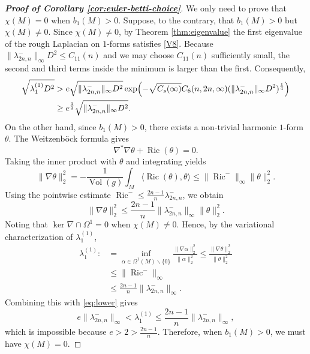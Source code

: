\documentclass[12pt, twoside]{article}
\theoremstyle{definition}
\numberwithin{equation}{section}
\def \a {\alpha }
\def \la {\lambda}
\def\Om{\Omega}
\def\na {\nabla}
\begin{document}
\begin{proof}[\textbf{Proof of Corollary \ref{cor:euler-betti-choice}}]
	We only need to prove that $\chi(M)=0$ when $b_{1}(M)>0$. Suppose, to the contrary, that $b_{1}(M)>0$ but $\chi(M)\neq0$. 
	Since $\chi(M)\neq0$, by Theorem \ref{thm:eigenvalue} the first eigenvalue of the rough Laplacian on $1$-forms satisfies \eqref{V8}. Because $\|\lambda^{-}_{2n,n}\|_{\infty}D^{2}\leq C_{11}(n)$ and we may choose $C_{11}(n)$ sufficiently small, the second and third terms inside the minimum is larger than the first. Consequently,
	\begin{equation}\label{eq:lower}
	\begin{split}
	\sqrt{\lambda_{1}^{(1)}D^{2}}&>e\sqrt{\|\la^{-}_{2n,n}\|_{\infty}D^{2}}\exp\Bigl(-\sqrt{C_s(\infty)}C_6(n,2n,\infty)(\|\la^{-}_{2n,n}\|_{\infty}D^{2})^{\frac{1}{4}}\Big)\\
	&\geq e^{\frac{1}{2}}\sqrt{\|\la^{-}_{2n,n}\|_{\infty}D^{2}}.
	\end{split}
	\end{equation}
	On the other hand, since $b_{1}(M)>0$, there exists a non-trivial harmonic $1$-form $\theta$. 
	The Weitzenb\"ock formula gives
	\[
	\nabla^{*}\nabla\theta+\operatorname{Ric}(\theta)=0.
	\]
	Taking the inner product with $\theta$ and integrating yields
	\[
	\|\nabla\theta\|_{2}^{2}= -\frac{1}{\operatorname{Vol}(g)}\int_{M}\langle\operatorname{Ric}(\theta),\theta\rangle
	\leq \|\operatorname{Ric}^{-}\|_{\infty}\|\theta\|_{2}^{2}.
	\]
	Using the pointwise estimate $\operatorname{Ric}^{-}\leq\frac{2n-1}{n}\lambda^{-}_{2n,n}$, we obtain
	\begin{equation}\label{eq:upper}
	\|\nabla\theta\|_{2}^{2}\leq \frac{2n-1}{n}\|\lambda^{-}_{2n,n}\|_{\infty}\|\theta\|_{2}^{2}.
	\end{equation}
	Noting that $\ker\na\cap\Om^{1}=0$ when $\chi(M)\neq0$. Hence, by the variational characterization of $\lambda_{1}^{(1)}$,
	\begin{equation*}
	\begin{split}
	\la_{1}^{(1)}:&=\inf_{\a\in\Om^{1}(M)\backslash\{0\} }\frac{\|\na\a\|_{2}^{2} }{\|\a\|_{2}^{2}}\leq\frac{\|\na\theta\|_{2}^{2} }{\|\theta\|_{2}^{2}}\\
	&\leq\|\operatorname{Ric}^{-}\|_{\infty}\\
	&\leq \frac{2n-1}{n}\|\la^{-}_{2n,n}\|_{\infty}.
	\end{split}
	\end{equation*}
	Combining this with \eqref{eq:lower} gives
	\[
e\|\lambda^{-}_{2n,n}\|_{\infty}
	<\lambda_{1}^{(1)}\leq\frac{2n-1}{n}\|\lambda^{-}_{2n,n}\|_{\infty},
	\]
	which is impossible because $e>2>\frac{2n-1}{n}$. 
	Therefore, when $b_{1}(M)>0$, we must have $\chi(M)=0$.
\end{proof}
\end{document}
